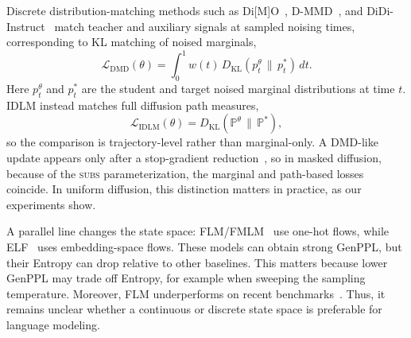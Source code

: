     Discrete distribution-matching methods such as
    Di[M]O~\citep{zhu_dimathttmo_2025}, D-MMD~\citep{hoogeboom2026beyond}, and
    DiDi-Instruct~\citep{zheng2026ultrafast} match teacher and auxiliary signals at
    sampled noising times, corresponding to KL matching of noised marginals,
    \[
        \mathcal L_{\mathrm{DMD}}(\theta)
        =
        \int_0^1 w(t)\,
        D_{\mathrm{KL}}\!\left(p_t^\theta\,\|\,p_t^*\right)\,dt .
    \]
    Here $p_t^\theta$ and $p_t^*$ are the student and target noised marginal
    distributions at time $t$.
    IDLM instead matches full diffusion path measures,
    \[
        \mathcal L_{\mathrm{IDLM}}(\theta)
        =
        D_{\mathrm{KL}}\!\left(\mathbb P^\theta\,\|\,\mathbb P^*\right),
    \]
    so the comparison is trajectory-level rather than marginal-only. A DMD-like
    update appears only after a stop-gradient reduction~\citep{selikhanovych2025one},
    so in masked diffusion, because of the \textsc{subs} parameterization, the
    marginal and path-based losses coincide. In uniform diffusion, this distinction
    matters in practice, as our experiments show.

    A parallel line changes the state space: FLM/FMLM~\citep{lee2026flow} use
    one-hot flows, while ELF~\citep{hu2026elf} uses embedding-space flows. These
    models can obtain strong GenPPL, but their Entropy can drop relative to other
    baselines. This matters because lower GenPPL may trade off Entropy, for example
    when sweeping the sampling temperature. Moreover, FLM underperforms on recent
    benchmarks~\citep{deschenaux2026language}. Thus, it remains unclear whether a
    continuous or discrete state space is preferable for language modeling.
